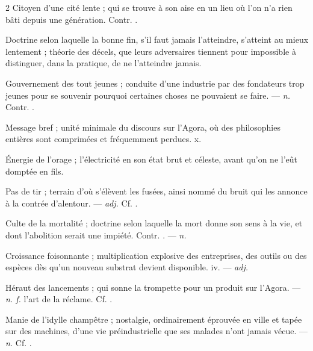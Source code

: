 \begin{multicols}{2}
 Citoyen d'une cité lente ; qui se trouve à son aise en un lieu où l'on n'a rien bâti depuis une génération. Contr. .

 Doctrine selon laquelle la bonne fin, s'il faut jamais l'atteindre, s'atteint au mieux lentement ; théorie des décels, que leurs adversaires tiennent pour impossible à distinguer, dans la pratique, de ne l'atteindre jamais.

  Gouvernement des tout jeunes ; conduite d'une industrie par des fondateurs trop jeunes pour se souvenir pourquoi certaines choses ne pouvaient se faire.  —  \textit{n.} Contr. .

 Message bref ; unité minimale du discours sur l'Agora, où des philosophies entières sont comprimées et fréquemment perdues.   x.

 Énergie de l'orage ; l'électricité en son état brut et céleste, avant qu'on ne l'eût domptée en fils.  

 Pas de tir ; terrain d'où s'élèvent les fusées, ainsi nommé du bruit qui les annonce à la contrée d'alentour. —  \textit{adj.} Cf. .

 Culte de la mortalité ; doctrine selon laquelle la mort donne son sens à la vie, et dont l'abolition serait une impiété. Contr. . —  \textit{n.}

 Croissance foisonnante ; multiplication explosive des entreprises, des outils ou des espèces dès qu'un nouveau substrat devient disponible.   iv. —  \textit{adj.}

 Héraut des lancements ; qui sonne la trompette pour un produit sur l'Agora. —  \textit{n. f.} l'art de la réclame. Cf. .

 Manie de l'idylle champêtre ; nostalgie, ordinairement éprouvée en ville et tapée sur des machines, d'une vie préindustrielle que ses malades n'ont jamais vécue. —  \textit{n.} Cf. .

\end{multicols}

